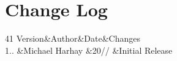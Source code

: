 \chapter{Change Log }
\hypertarget{changelog}{}\label{changelog}

\begin{DoxyTable}{4}{}{}{1}
Version&Author&Date&Changes \\
1.. &Michael Harhay &20// &Initial Release \\
\end{DoxyTable}
